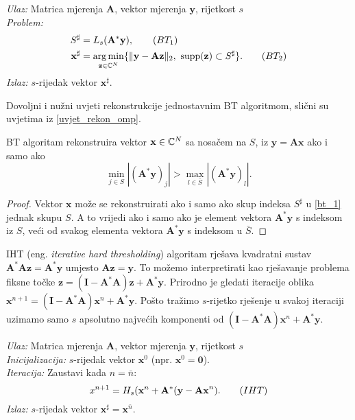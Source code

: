 \documentclass[a4paper,twoside,12pt]{memoir} %
\newcommand{\vect}[1]{\mathbf{#1}}
\renewcommand{\vec}{\vect}
\newcommand{\supp}{\text{\normalfont{supp}}}
\newcommand{\norm}[1]{\|{#1}\|}
\DeclareMathOperator*{\argmin}{arg\,min}
\newenvironment{alg}[1]
{
    \bigskip
    \begin{tcolorbox}[arc=0mm,boxrule=1.2pt,colframe=black,colback=white,detach title, before upper={\medskip\begin{center}\textbf{#1}\end{center}\hline\newline\medskip},frame hidden]
    \medskip
}
{
    \medskip
\end{tcolorbox}
    \bigskip
}
\begin{document}
\begin{alg}{BT}
    \textit{Ulaz:} Matrica mjerenja $\vec A$, vektor mjerenja $\vec y$, rijetkost $s$ \\
    \textit{Problem:}
        \begin{align*}
            S^{\sharp} &= L_s(\vec A^* \vec y),\tag{$BT_1$}\label{bt_1}\\
            \vec x^{\sharp} &= \argmin_{\vec z \in \C^N}\{\norm{\vec y - \vec{Az}}_2,\ \supp(\vec z) \subset S^{\sharp}\}.\tag{$BT_2$}\label{bt_2}\\
        \end{align*}
        \textit{Izlaz:} $s$-rijedak vektor $\vec x^{\sharp}$.
\end{alg}

\noindent Dovoljni i nu\v{z}ni uvjeti rekonstrukcije jednostavnim BT algoritmom, sli\v{c}ni su uvjetima iz \eqref{uvjet_rekon_omp}.
\begin{prop}\label{prop:3:7}
    BT algoritam rekonstruira vektor $\vec x \in \C^N$ sa nosa\v{c}em na $S$, iz $\vec y = \vec{Ax}$ ako i samo ako
    \begin{equation}\label{bt_uvjet}
        \min_{j \in S}|(\vec A^* \vec y)_j| > \max_{l \in \bar{S}} |(\vec A^* \vec y)_l| .
    \end{equation}
\end{prop}
\begin{proof}
    Vektor $\vec x$ mo\v{z}e se rekonstruirati ako i samo ako skup indeksa $S^{\sharp}$ u \eqref{bt_1} jednak skupu $S$. A to vrijedi ako i samo ako je element vektora $\vec A^* \vec y$ s indeksom iz $S$, ve\'ci od svakog elementa vektora $\vec A^* \vec y$ s indeksom u $\bar{S}$.
\end{proof}
\indent
IHT (eng. \textit{iterative hard thresholding}) algoritam rje\v{s}ava kvadratni sustav $\vec A^* \vec A \vec z= \vec A^* \vec y$ umjesto $\vec{Az}=\vec y$. To mo\v{z}emo interpretirati kao rje\v{s}avanje problema fiksne to\v{c}ke $\vec z = (\vec{I}- \vec A^* \vec A ) \vec z + \vec A^* \vec y$. Prirodno je gledati iteracije oblika $\vec x^{n+1} = (\vec{I}- \vec A^* \vec A) \vec x^n + \vec A^* \vec y$. Po\v{s}to tra\v{z}imo $s$-rijetko rje\v{s}enje u svakoj iteraciji uzimamo samo $s$ apsolutno najve\'cih komponenti od $(\vec{I} - \vec A^* \vec A ) \vec x^n + \vec A^* \vec y$.

\begin{alg}{IHT}
    \textit{Ulaz:} Matrica mjerenja $\vec A$, vektor mjerenja $\vec y$, rijetkost $s$ \\
    \textit{Inicijalizacija:} $s$-rijedak vektor $\vec x^0$ (npr. $\vec x^0 = \vec 0$).\\
    \textit{Iteracija:} Zaustavi kada $n = \bar{n}$:
        \begin{equation}
            x^{n+1} = H_s(\vec x^n + \vec A^* (\vec y - \vec{Ax}^n).\tag{$IHT$}\label{iht}\\
        \end{equation}
        \textit{Izlaz:} $s$-rijedak vektor $\vec x^{\sharp}=\vec x^{\bar n}$.
\end{alg}
\end{document}
